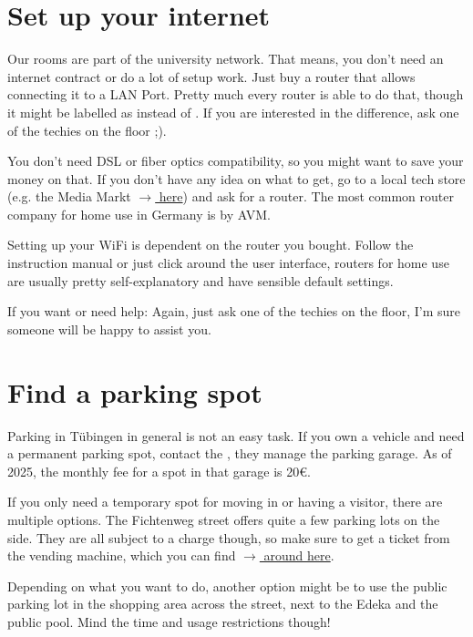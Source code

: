 \section{Set up your internet}
Our rooms are part of the university network. That means, you don't need an internet contract or do a lot of setup work. Just buy a router that allows connecting it to a LAN Port. Pretty much every router is able to do that, though it might be labelled as  instead of . If you are interested in the difference, ask one of the techies on the floor ;). 

You don't need DSL or fiber optics compatibility, so you might want to save your money on that. If you don't have any idea on what to get, go to a local tech store (e.g. the Media Markt \href{https://maps.app.goo.gl/XmRXQEo6ihkXH9jS9}{$\xrightarrow{}$ here}) and ask for a router. The most common router company for home use in Germany is  by AVM.

Setting up your WiFi is dependent on the router you bought. Follow the instruction manual or just click around the user interface, routers for home use are usually pretty self-explanatory and have sensible default settings.

If you want or need help: Again, just ask one of the techies on the floor, I'm sure someone will be happy to assist you.

\section{Find a parking spot}
Parking in Tübingen in general is not an easy task. If you own a vehicle and need a permanent parking spot, contact the , they manage the parking garage. As of 2025, the monthly fee for a spot in that garage is 20€.

If you only need a temporary spot for moving in or having a visitor, there are multiple options. The Fichtenweg street offers quite a few parking lots on the side. They are all subject to a charge though, so make sure to get a ticket from the vending machine, which you can find \href{https://maps.app.goo.gl/Wi5gXiBErb9xiCWt9}{$\xrightarrow{}$ around here}.

Depending on what you want to do, another option might be to use the public parking lot in the shopping area across the street, next to the Edeka and the public pool. Mind the time and usage restrictions though!